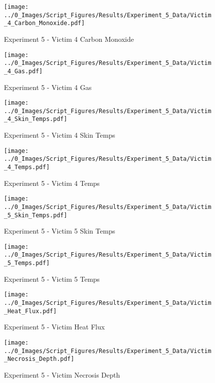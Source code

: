 	\begin{figure}[H]
		\centering
		\texttt{[image: ../0\_Images/Script\_Figures/Results/Experiment\_5\_Data/Victim\_4\_Carbon\_Monoxide.pdf]}
		\caption[]{Experiment 5 - Victim 4 Carbon Monoxide}
	\end{figure}
 
	\clearpage

	\begin{figure}[H]
		\centering
		\texttt{[image: ../0\_Images/Script\_Figures/Results/Experiment\_5\_Data/Victim\_4\_Gas.pdf]}
		\caption[]{Experiment 5 - Victim 4 Gas}
	\end{figure}
 

	\begin{figure}[H]
		\centering
		\texttt{[image: ../0\_Images/Script\_Figures/Results/Experiment\_5\_Data/Victim\_4\_Skin\_Temps.pdf]}
		\caption[]{Experiment 5 - Victim 4 Skin Temps}
	\end{figure}
 
	\clearpage

	\begin{figure}[H]
		\centering
		\texttt{[image: ../0\_Images/Script\_Figures/Results/Experiment\_5\_Data/Victim\_4\_Temps.pdf]}
		\caption[]{Experiment 5 - Victim 4 Temps}
	\end{figure}
 

	\begin{figure}[H]
		\centering
		\texttt{[image: ../0\_Images/Script\_Figures/Results/Experiment\_5\_Data/Victim\_5\_Skin\_Temps.pdf]}
		\caption[]{Experiment 5 - Victim 5 Skin Temps}
	\end{figure}
 
	\clearpage

	\begin{figure}[H]
		\centering
		\texttt{[image: ../0\_Images/Script\_Figures/Results/Experiment\_5\_Data/Victim\_5\_Temps.pdf]}
		\caption[]{Experiment 5 - Victim 5 Temps}
	\end{figure}
 

	\begin{figure}[H]
		\centering
		\texttt{[image: ../0\_Images/Script\_Figures/Results/Experiment\_5\_Data/Victim\_Heat\_Flux.pdf]}
		\caption[]{Experiment 5 - Victim Heat Flux}
	\end{figure}
 
	\clearpage

	\begin{figure}[H]
		\centering
		\texttt{[image: ../0\_Images/Script\_Figures/Results/Experiment\_5\_Data/Victim\_Necrosis\_Depth.pdf]}
		\caption[]{Experiment 5 - Victim Necrosis Depth}
	\end{figure}
 

